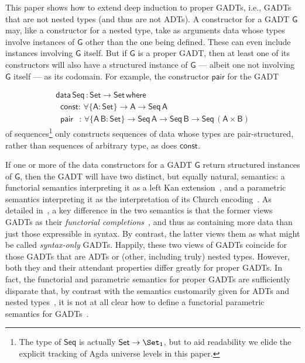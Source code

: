 \documentclass[sigplan,10pt,anonymous,review]{acmart}
\begin{document}
This paper shows how to extend deep induction to proper GADTs, i.e.,
GADTs that are not nested types (and thus are not ADTs).  A
constructor for a GADT $\mathsf{G}$ may, like a constructor for a
nested type, take as arguments data whose types involve instances of
$\mathsf{G}$ other than the one being defined. These can even include
instances involving $\mathsf{G}$ itself. But if $\mathsf{G}$ is a
proper GADT, then at least one of its constructors will also have a
structured instance of $\mathsf{G}$ --- albeit one not involving
$\mathsf{G}$ itself --- as its codomain.
For example, the constructor $\mathsf{pair}$ for the GADT 

\vspace*{-0.1in}

\begin{equation}\label{eq:seq}
\begin{array}{l}
\mathsf{data\, Seq\,: Set \to Set\,where}\\
\mathsf{\;\;const :\, \forall \{A : Set\} \to A \to Seq\,A}\\
\mathsf{\;\;pair\;\;\, :\,\forall \{A\,B : Set\} \to Seq \,A \to Seq\,B \to
  Seq\,(A \times B)}
\end{array}
\end{equation}
\noindent
of sequences\footnote{The type of $\mathsf{Seq}$ is actually
  $\mathsf{Set \to \Set_1}$, but to aid readability we elide the
  explicit tracking of Agda universe levels in this paper.} only
constructs sequences of data whose types are pair-structured, rather
than sequences of arbitrary type, as does $\mathsf{const}$.

If one or more of the data constructors for a GADT $\mathsf{G}$ return
structured instances of $\mathsf{G}$, then the GADT will have two
distinct, but equally natural, semantics: a functorial semantics
interpreting it as a left Kan extension~\cite{mac71}, and a parametric
semantics interpreting it as the interpretation of its Church
encoding~\cite{atk12,vw10}. As detailed in~\cite{jgj21}, a key
difference in the two semantics is that the former views GADTs as
their {\em functorial completions}~\cite{jp19}, and thus as containing
more data than just those expressible in syntax. By contrast, the
latter views them as what might be called {\em syntax-only}
GADTs. Happily, these two views of GADTs coincide for those GADTs that
are ADTs or (other, including truly) nested types.  However, both they
and their attendant properties differ greatly for proper GADTs. In
fact, the functorial and parametric semantics for proper GADTs are
sufficiently disparate that, by contrast with the semantics
customarily given for ADTs and nested
types~\cite{bfss90,gjfor15,jgj21f}, it is not at all clear how to
define a functorial parametric semantics for GADTs~\cite{jgj21}.
\end{document}
